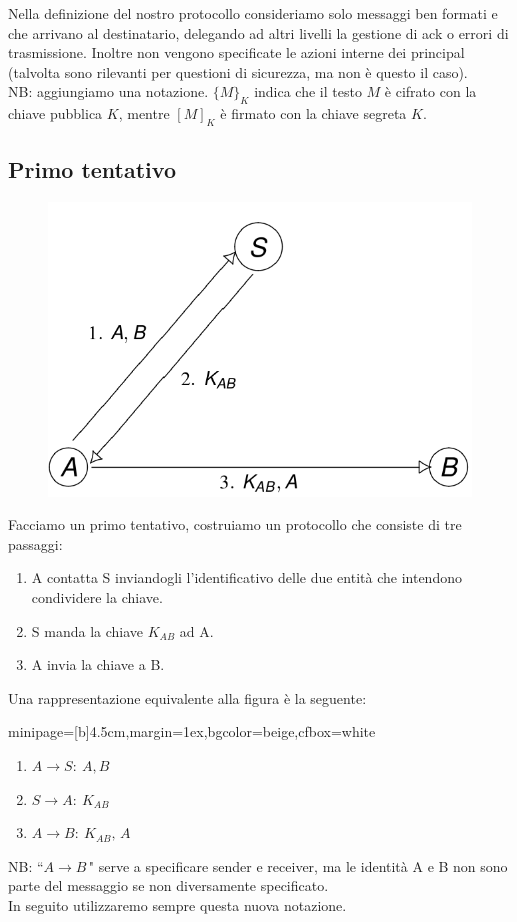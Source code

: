 \documentclass[a4paper, 11pt, notitlepage, fleqn]{report}
\newcommand{\fromto}[2]{#1\rightarrow #2\!:\ }
\newenvironment{colbox}[2]%
{%
	\par\noindent\hspace{10pt}
	\begin{adjustbox}{minipage=[b]{#2},margin=1ex,bgcolor=#1,cfbox=white}
}{%
	\end{adjustbox}\newline%
}
\begin{document}
Nella definizione del nostro protocollo consideriamo solo messaggi ben formati e che arrivano al destinatario, delegando ad altri livelli la gestione di ack o errori di trasmissione. Inoltre non vengono specificate le azioni interne dei principal (talvolta sono rilevanti per questioni di sicurezza, ma non è questo il caso).\\
NB: aggiungiamo una notazione. $\{M\}_K$ indica che il testo $M$ è cifrato con la chiave pubblica $K$, mentre $[M]_K$ è firmato con la chiave segreta $K$.


\subsection{Primo tentativo}
\begin{figure}[htp]
	\centering
	\includegraphics[width=.5\textwidth]{images/builtproto1}
\end{figure}
\noindent
Facciamo un primo tentativo, costruiamo un protocollo che consiste di tre passaggi:
\begin{enumerate}
	\item A contatta S inviandogli l'identificativo delle due entità che intendono condividere la chiave.
	\item S manda la chiave $K_{AB}$ ad A.
	\item A invia la chiave a B.
\end{enumerate}
Una rappresentazione equivalente alla figura è la seguente:
\begin{colbox}{beige}{4.5cm}
	\begin{enumerate}
		\item $\fromto{A}{S}A, B$
		\item $\fromto{S}{A}K_{AB}$
		\item $\fromto{A}{B}K_{AB},\,A$
	\end{enumerate}
\end{colbox}
NB: ``$A\rightarrow B\,$" serve a specificare sender e receiver, ma le identità A e B non sono parte del messaggio se non diversamente specificato.\\
In seguito utilizzaremo sempre questa nuova notazione.
\end{document}
